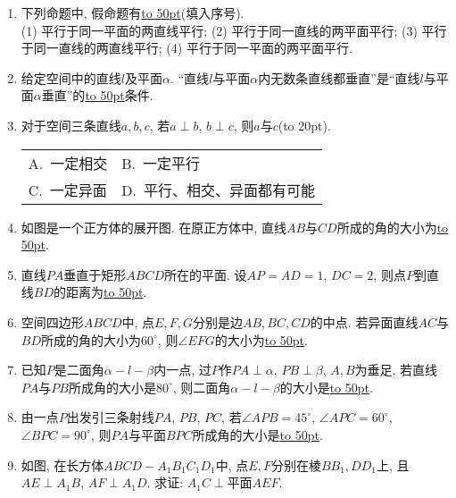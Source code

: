 \documentclass[10pt,a4paper]{article}
\newcommand{\blank}[1]{\underline{\hbox to #1pt{}}}
\newcommand{\bracket}[1]{(\hbox to #1pt{})}
\newcommand{\twoch}[4]{\par\begin{tabular}{p{.46\textwidth}p{.46\textwidth}}
A.~#1& B.~#2\\
C.~#3& D.~#4
\end{tabular}}
\begin{document}
\begin{enumerate}[1.]

\item 下列命题中, 假命题有\blank{50}(填入序号).\\
(1) 平行于同一平面的两直线平行; (2) 平行于同一直线的两平面平行; (3) 平行于同一直线的两直线平行; (4) 平行于同一平面的两平面平行.
\item 给定空间中的直线$l$及平面$\alpha$. ``直线$l$与平面$\alpha$内无数条直线都垂直''是``直线$l$与平面$\alpha$垂直''的\blank{50}条件.
\item 对于空间三条直线$a,b,c$, 若$a\perp b$, $b\perp c$, 则$a$与$c$\bracket{20}.
\twoch{一定相交}{一定平行}{一定异面}{平行、相交、异面都有可能}
\item 如图是一个正方体的展开图. 在原正方体中, 直线$AB$与$CD$所成的角的大小为\blank{50}.
\begin{center}
\end{center}
\item 直线$PA$垂直于矩形$ABCD$所在的平面. 设$AP=AD=1$, $DC=2$, 则点$P$到直线$BD$的距离为\blank{50}.
\item 空间四边形$ABCD$中, 点$E,F,G$分别是边$AB,BC,CD$的中点. 若异面直线$AC$与$BD$所成的角的大小为$60^\circ$, 则$\angle EFG$的大小为\blank{50}.
\item 已知$P$是二面角$\alpha-l-\beta$内一点, 过$P$作$PA\perp \alpha$, $PB\perp \beta$, $A,B$为垂足, 若直线$PA$与$PB$所成角的大小是$80^\circ$, 则二面角$\alpha-l-\beta$的大小是\blank{50}.
\item 由一点$P$出发引三条射线$PA$, $PB$, $PC$, 若$\angle APB=45^\circ$, $\angle APC=60^\circ$, $\angle BPC=90^\circ$, 则$PA$与平面$BPC$所成角的大小是\blank{50}.
\item 如图, 在长方体$ABCD-A_1B_1C_1D_1$中, 点$E,F$分别在棱$BB_1, DD_1$上, 且$AE\perp A_1B$, $AF\perp A_1D$. 求证: $A_1C\perp$平面$AEF$.
\begin{center}

\end{center}
\end{enumerate}
\end{document}
